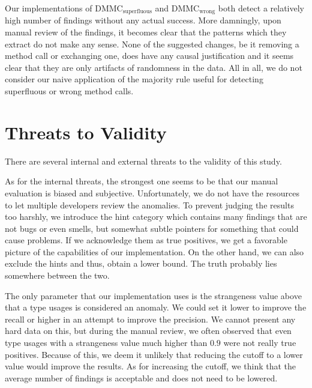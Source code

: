 Our implementations of $\text{DMMC}_\text{superfluous}$ and $\text{DMMC}_\text{wrong}$ both detect a relatively high number of findings without any actual success.
More damningly, upon manual review of the findings, it becomes clear that the patterns which they extract do not make any sense.
None of the suggested changes, be it removing a method call or exchanging one, does have any causal justification and it seems clear that they are only artifacts of randomness in the data.
All in all, we do not consider our naive application of the majority rule useful for detecting superfluous or wrong method calls.

\section{Threats to Validity}

There are several internal and external threats to the validity of this study.

As for the internal threats, the strongest one seems to be that our manual evaluation is biased and subjective.
Unfortunately, we do not have the resources to let multiple developers review the anomalies.
To prevent judging the results too harshly, we introduce the hint category which contains many findings that are not bugs or even smells, but somewhat subtle pointers for something that could cause problems.
If we acknowledge them as true positives, we get a favorable picture of the capabilities of our implementation.
On the other hand, we can also exclude the hints and thus, obtain a lower bound.
The truth probably lies somewhere between the two.

The only parameter that our implementation uses is the strangeness value above that a type usages is considered an anomaly.
We could set it lower to improve the recall or higher in an attempt to improve the precision.
We cannot present any hard data on this, but during the manual review, we often observed that even type usages with a strangeness value much higher than $0.9$ were not really true positives.
Because of this, we deem it unlikely that reducing the cutoff to a lower value would improve the results.
As for increasing the cutoff, we think that the average number of findings is acceptable and does not need to be lowered.

